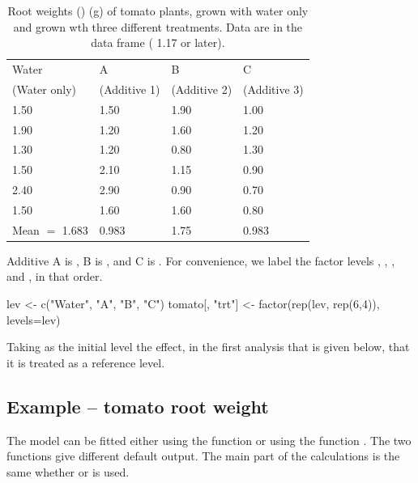\begin{table}[h]
\begin{tabular}{@{}llll@{}}
    Water & A  & B  & C  \\
 (Water only) & (Additive 1) & (Additive 2) & (Additive 3)\\
\hphantom{Mean $=$} 1.50 & 1.50  &1.90 &1.00 \\
\hphantom{Mean $=$} 1.90 & 1.20  &1.60 &1.20 \\
\hphantom{Mean $=$} 1.30 & 1.20 & 0.80 &1.30 \\
\hphantom{Mean $=$} 1.50 & 2.10 & 1.15 &0.90 \\
\hphantom{Mean $=$} 2.40 & 2.90 & 0.90 &0.70 \\
\hphantom{Mean $=$} 1.50 & 1.60 & 1.60 &0.80 \\
\hline
    Mean $=$ 1.683 & 0.983 & 1.75 & 0.983 \\
\end{tabular}
\caption{Root weights ({\em {}}) (g) of tomato
  plants, grown with water only and grown wth three different
  treatments. Data are in the data frame  (
  1.17 or later).\label{tab:tomatowt}}
\end{table}
\vspace*{9pt}

Additive A is , B is , and
C is .  For convenience, we label the factor levels
, , , and , in that order.
\begin{Schunk}
\begin{Sinput}
lev <- c("Water", "A", "B", "C")
tomato[, "trt"] <- factor(rep(lev, rep(6,4)),
                          levels=lev)
\end{Sinput}
\end{Schunk}
Taking  as the initial level the effect, in the first
analysis that is given below, that it is treated as a reference
level.

\subsection{Example -- tomato root weight}\label{tomato}

The model can be fitted either using the function  or
using the function .  The two functions give different
default output.  The main part of the calculations is the same
whether  or  is used.

